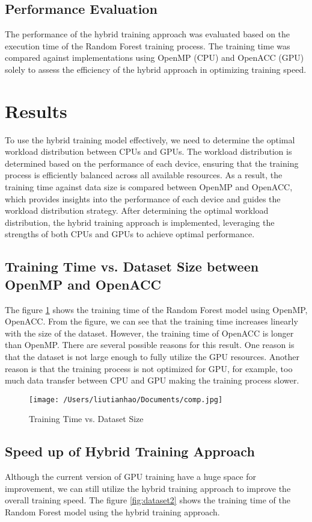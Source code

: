 \documentclass[13pt]{article}
\begin{document}
\subsection{Performance Evaluation}
The performance of the hybrid training approach was evaluated based on the execution time of the Random Forest training process.
The training time was compared against implementations using OpenMP (CPU) and OpenACC (GPU) solely to assess the efficiency of the hybrid approach in optimizing training speed.

\newpage
\section{Results}
To use the hybrid training model effectively, we need to determine the optimal workload distribution between CPUs and GPUs.
The workload distribution is determined based on the performance of each device, ensuring that the training process is efficiently balanced across all available resources.
As a result, the training time against data size is compared between OpenMP and OpenACC, which provides insights into the performance of each device and guides the workload distribution strategy.
After determining the optimal workload distribution, the hybrid training approach is implemented, leveraging the strengths of both CPUs and GPUs to achieve optimal performance.

\subsection{Training Time vs. Dataset Size between OpenMP and OpenACC}
The figure \ref{fig:dataset1} shows the training time of the Random Forest model using OpenMP, OpenACC.
From the figure, we can see that the training time increases linearly with the size of the dataset. However, the training time of OpenACC is longer than OpenMP.
There are several possible reasons for this result.
One reason is that the dataset is not large enough to fully utilize the GPU resources.
Another reason is that the training process is not optimized for GPU, for example, too much data transfer between CPU and GPU making the training process slower.

\begin{figure}[ht]
    \centering
    \texttt{[image: /Users/liutianhao/Documents/comp.jpg]}
    \caption{Training Time vs. Dataset Size}
    \label{fig:dataset1}
\end{figure}

\subsection{Speed up of Hybrid Training Approach}
Although the current version of GPU training have a huge space for improvement, we can still utilize the hybrid training approach to improve the overall training speed.
The figure \ref{fig:dataset2} shows the training time of the Random Forest model using the hybrid training approach.
\end{document}
